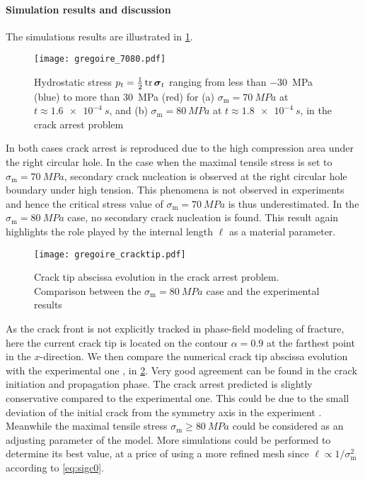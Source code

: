 \paragraph{Simulation results and discussion} The simulations results are illustrated in \cref{fig:siggregoire}.
\begin{figure}[htbp]
\centering
\texttt{[image: gregoire\_7080.pdf]}
\caption{Hydrostatic stress $p_t=\frac{1}{2}\tr\sig_t$ ranging from less than \SI{-30}{MPa} (blue) to more than \SI{30}{MPa} (red) for (a) $\sigma_\mathrm{m}=\SI{70}{MPa}$ at $t\approx\SI{1.6e-4}{s}$, and (b) $\sigma_\mathrm{m}=\SI{80}{MPa}$ at $t\approx\SI{1.8e-4}{s}$, in the crack arrest problem} \label{fig:siggregoire}
\end{figure}
In both cases crack arrest is reproduced due to the high compression area under the right circular hole. In the case when the maximal tensile stress is set to $\sigma_\mathrm{m}=\SI{70}{MPa}$, secondary crack nucleation is observed at the right circular hole boundary under high tension. This phenomena is not observed in experiments and hence the critical stress value of $\sigma_\mathrm{m}=\SI{70}{MPa}$ is thus underestimated. In the $\sigma_\mathrm{m}=\SI{80}{MPa}$ case, no secondary crack nucleation is found. This result again highlights the role played by the internal length $\ell$ as a material parameter.
\begin{figure}[htbp]
\centering
\texttt{[image: gregoire\_cracktip.pdf]}
\caption{Crack tip abscissa evolution in the crack arrest problem. Comparison between the $\sigma_\mathrm{m}=\SI{80}{MPa}$ case and the experimental results} \label{fig:cracktip}
\end{figure}

As the crack front is not explicitly tracked in phase-field modeling of fracture, here the current crack tip is located on the contour $\alpha=0.9$ at the farthest point in the $x$-direction. We then compare the numerical crack tip abscissa evolution with the experimental one \cite{HaboussaGregoireElguedjMaigreCombescure:2011}, in \cref{fig:cracktip}. Very good agreement can be found in the crack initiation and propagation phase. The crack arrest predicted is slightly conservative compared to the experimental one. This could be due to the small deviation of the initial crack from the symmetry axis in the experiment \cite{HaboussaGregoireElguedjMaigreCombescure:2011}. Meanwhile the maximal tensile stress $\sigma_\mathrm{m}\geq\SI{80}{MPa}$ could be considered as an adjusting parameter of the model. More simulations could be performed to determine its best value, at a price of using a more refined mesh since $\ell\propto1/\sigma_\mathrm{m}^2$ according to \eqref{eq:sigc0}.

